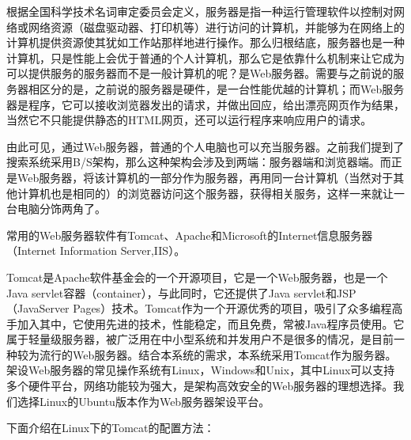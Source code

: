 \documentclass[12pt,a4paper]{article}
\begin{document}
	根据全国科学技术名词审定委员会定义，服务器是指一种运行管理软件以控制对网络或网络资源（磁盘驱动器、打印机等）进行访问的计算机，并能够为在网络上的计算机提供资源使其犹如工作站那样地进行操作。那么归根结底，服务器也是一种计算机，只是性能上会优于普通的个人计算机，那么它是依靠什么机制来让它成为可以提供服务的服务器而不是一般计算机的呢？是{\Times Web}服务器。需要与之前说的服务器相区分的是，之前说的服务器是硬件，是一台性能优越的计算机；而{\Times Web}服务器是程序，它可以接收浏览器发出的请求，并做出回应，给出漂亮网页作为结果，当然它不只能提供静态的{\Times HTML}网页，还可以运行程序来响应用户的请求。
	
	由此可见，通过{\Times Web}服务器，普通的个人电脑也可以充当服务器。之前我们提到了搜索系统采用{\Times B/S}架构，那么这种架构会涉及到两端：服务器端和浏览器端。而正是{\Times Web}服务器，将该计算机的一部分作为服务器，再用同一台计算机（当然对于其他计算机也是相同的）的浏览器访问这个服务器，获得相关服务，这样一来就让一台电脑分饰两角了。
	
	常用的{\Times Web}服务器软件有{\Times Tomcat}、{\Times Apache}和{\Times Microsoft}的{\Times Internet}信息服务器（{\Times Internet Information Server},{\Times IIS}）。

	{\Times Tomcat}是{\Times Apache}软件基金会的一个开源项目，它是一个{\Times Web}服务器，也是一个{\Times Java servlet}容器（{\Times container}），与此同时，它还提供了{\Times Java servlet}和{\Times JSP}（{\Times JavaServer Pages}）技术。{\Times Tomcat}作为一个开源优秀的项目，吸引了众多编程高手加入其中，它使用先进的技术，性能稳定，而且免费，常被Java程序员使用。它属于轻量级服务器，被广泛用在中小型系统和并发用户不是很多的情况，是目前一种较为流行的Web服务器。结合本系统的需求，本系统采用{\Times Tomcat}作为服务器。架设{\Times Web}服务器的常见操作系统有{\Times Linux}，{\Times Windows}和{\Times Unix}，其中{\Times Linux}可以支持多个硬件平台，网络功能较为强大，是架构高效安全的{\Times Web}服务器的理想选择。我们选择{\Times Linux}的{\Times Ubuntu}版本作为{\Times Web}服务器架设平台。
	
	下面介绍在{\Times Linux}下的{\Times Tomcat}的配置方法：
	
\end{document}
